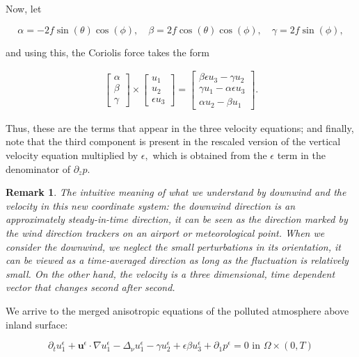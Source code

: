 \documentclass[11pt]{article}
\newtheorem{remark}{Remark}
\begin{document}
Now, let

$$\alpha = -2 f \sin(\theta)\cos(\phi), \quad \beta = 2 f \cos(\theta) \cos(\phi), \quad \gamma = 2 f \sin(\phi),$$

and using this, the Coriolis force takes the form

\begin{gather}
\begin{bmatrix} \alpha \\ \beta \\ \gamma \end{bmatrix}
 \times
 \begin{bmatrix} u_1 \\ u_2 \\ \epsilon u_3 \end{bmatrix}
 =
 \begin{bmatrix}  \beta \epsilon u_3 - \gamma u_2 \\ \gamma u_1 - \alpha \epsilon u_3  \\ \alpha u_2 - \beta u_1 \end{bmatrix}.
\end{gather}

Thus, these are the terms that appear in the three velocity equations; and finally, note that the third component is present in the rescaled version of the vertical velocity equation multiplied by $\epsilon,$ which is obtained from the $\epsilon$ term in the denominator of $\partial_z p.$

\begin{remark} \normalfont
The intuitive meaning of what we understand by downwind and the velocity in this new coordinate system: the downwind direction is an approximately steady-in-time direction, it can be seen as the direction marked by the wind direction trackers on an airport or meteorological point. When we consider the downwind, we neglect the small perturbations in its orientation, it can be viewed as a time-averaged direction as long as the fluctuation is relatively small. On the other hand, the velocity is a three dimensional, time dependent vector that changes second after second. 

\end{remark}
    
    We arrive to the merged anisotropic equations of the polluted atmosphere above inland surface:
  
    \begin{equation} \label{ANSC1}
    \partial_t u^\epsilon _1 + \mathbf{u}^\epsilon \cdot \nabla u^\epsilon _1 -\Delta_\nu u^\epsilon _1 -\gamma u_2^\epsilon + \epsilon \beta u_3^\epsilon + \partial_1 p^\epsilon = 0 \text{ in } \Omega \times (0,T)
    \end{equation}
    
\end{document}
